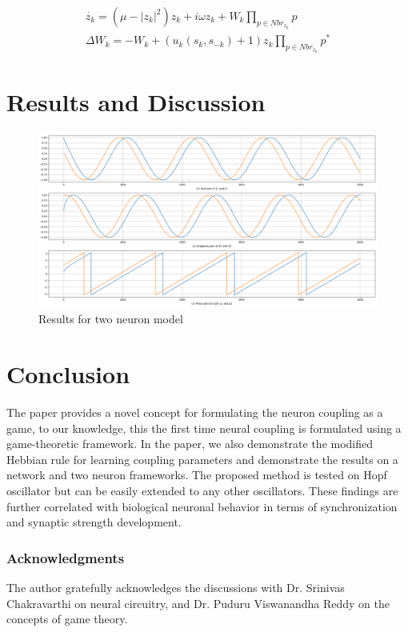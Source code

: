 \documentclass{article}
\begin{document}
\begin{subequations}
\label{eqn: multi_neuron}
\begin{align}
 \dot{z_k} = (\mu - |z_k|^2)z_k + i\omega z_k + W_k \prod_{p \in Nbr_{z_k}} p \\ 
 \Delta W_k = - W_k + (u_k(s_k, s_{-k}) + 1)z_k \prod_{p \in Nbr_{z_k}}p^*
\end{align}
\end{subequations}

\section{Results and Discussion}
\label{resdis}
\begin{figure}[h]
    \centering
    \includegraphics[width=1.\textwidth]{two_neuron_phase_potential.png}
    \caption{Results for two neuron model}
    \label{hist_exp}
\end{figure}
\section{Conclusion}
\label{conc}
The paper provides a novel concept for formulating the neuron coupling as a game, to our knowledge, this the first time neural coupling is formulated using a game-theoretic framework. In the paper, we also demonstrate the modified Hebbian rule for learning coupling parameters and demonstrate the results on a network and two neuron frameworks. The proposed method is tested on Hopf oscillator but can be easily extended to any other oscillators. These findings are further correlated with biological neuronal behavior in terms of synchronization and synaptic strength development.  

\subsubsection*{Acknowledgments}

The author gratefully acknowledges the discussions with Dr. Srinivas Chakravarthi on neural circuitry, and Dr. Puduru Viswanandha Reddy on the concepts of game theory.



\end{document}
